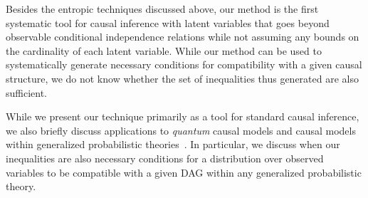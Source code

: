 Besides the entropic techniques discussed above, our method is the first systematic tool for causal inference with latent variables that goes beyond observable conditional independence relations while not assuming any bounds on the cardinality of each latent variable. While our method can be used to systematically generate necessary conditions for compatibility with a given causal structure, we do not know whether the set of inequalities thus generated are also sufficient.  



While we present our technique primarily as a tool for standard causal inference, we also briefly discuss applications to {\em quantum} causal models and causal models within generalized probabilistic theories~\cite{fritz2012bell,pusey2014gdag,chaves2014informationinference,BeyondBellII}.  In particular, we discuss when our inequalities are also necessary conditions for a distribution over observed variables to be compatible with a given DAG within any generalized probabilistic theory. 




